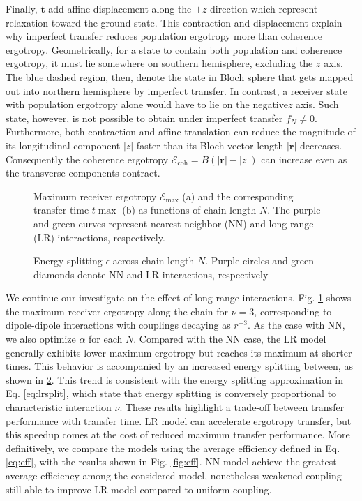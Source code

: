 \documentclass[../../../main.tex]{subfiles}
\begin{document}
Finally, $\textbf{t}$ add affine displacement along the \(+z\) direction which represent relaxation toward the ground-state. 
This contraction and displacement explain why imperfect transfer reduces population ergotropy more than coherence ergotropy.
Geometrically, for a state to contain both population and coherence ergotropy, it must lie somewhere on southern hemisphere, excluding the $z$ axis.
The blue dashed region, then, denote the state in Bloch sphere that gets mapped out into northern hemisphere by imperfect transfer.
In contrast, a receiver state with population ergotropy alone would have to lie on the negative$z$ axis.
Such state, however, is not possible to obtain under imperfect transfer $f_N \neq 0$.
Furthermore, both contraction and affine translation can reduce the magnitude of its longitudinal component $|z|$ faster than its Bloch vector length $|\mathbf{r}|$ decreases.
Consequently the coherence ergotropy $\mathcal E_{\mathrm{coh}}=B(|\mathbf r|-|z|)$ can increase even as the transverse components contract.

\begin{figure}
  \centering
  \caption{Maximum receiver ergotropy $\mathcal{E}_{\max}$ (a) and the corresponding transfer time $t{\max}$ (b) as functions of chain length $N$. The purple and green curves represent nearest-neighbor (NN) and long-range (LR) interactions, respectively.}
  \label{fig:lrinteraction}
\end{figure}

\begin{figure}
  \centering
  \caption{Energy splitting $\epsilon$ across chain length $N$. Purple circles and green diamonds denote NN and LR interactions, respectively}
  \label{fig:lrenergy}
\end{figure}

We  continue our investigate on the effect of long-range interactions. 
Fig. \ref{fig:lrinteraction} shows the maximum receiver ergotropy along the chain for $\nu=3$, corresponding to dipole-dipole interactions with couplings decaying as $r^{-3}$.
As the case with NN, we also optimize $\alpha$ for each $N$. 
Compared with the NN case, the LR model generally exhibits lower maximum ergotropy but reaches its maximum at shorter times. 
This behavior is accompanied by an increased energy splitting between, as shown in \ref{fig:lrenergy}.
This trend is consistent with the energy splitting approximation in Eq. \ref{eq:lrsplit}, which state that energy splitting is conversely proportional to characteristic interaction $\nu$. 
These results highlight a trade-off between transfer performance with transfer time.
LR model can accelerate ergotropy transfer, but this speedup comes at the cost of reduced maximum transfer performance.
More definitively, we compare the models using the average efficiency defined in Eq. \ref{eq:eff}, with the results shown in Fig. \ref{fig:eff}.
NN model achieve the greatest average efficiency among the considered model, nonetheless weakened coupling still able to improve LR model compared to uniform coupling.
\end{document}
